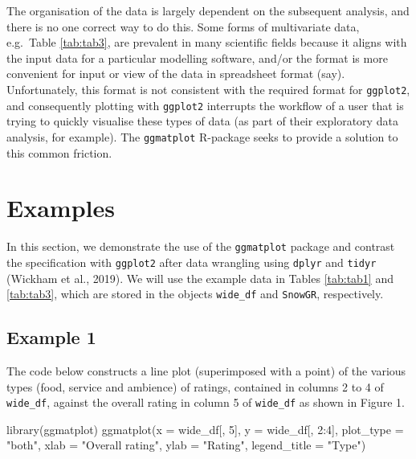 \documentclass[10pt,a4paper,onecolumn]{article}
\newenvironment{Shaded}{\begin{snugshade}}{\end{snugshade}}
\newcommand{\AttributeTok}[1]{\textcolor[rgb]{0.77,0.63,0.00}{#1}}
\newcommand{\DecValTok}[1]{\textcolor[rgb]{0.00,0.00,0.81}{#1}}
\newcommand{\FunctionTok}[1]{\textcolor[rgb]{0.00,0.00,0.00}{#1}}
\newcommand{\NormalTok}[1]{#1}
\newcommand{\SpecialCharTok}[1]{\textcolor[rgb]{0.00,0.00,0.00}{#1}}
\newcommand{\StringTok}[1]{\textcolor[rgb]{0.31,0.60,0.02}{#1}}
\begin{document}
The organisation of the data is largely dependent on the subsequent
analysis, and there is no one correct way to do this. Some forms of
multivariate data, e.g.~Table \ref{tab:tab3}, are prevalent in many
scientific fields because it aligns with the input data for a particular
modelling software, and/or the format is more convenient for input or
view of the data in spreadsheet format (say). Unfortunately, this format
is not consistent with the required format for \texttt{ggplot2}, and
consequently plotting with \texttt{ggplot2} interrupts the workflow of a
user that is trying to quickly visualise these types of data (as part of
their exploratory data analysis, for example). The \texttt{ggmatplot}
R-package seeks to provide a solution to this common friction.

\hypertarget{examples}{%
\section{Examples}\label{examples}}

In this section, we demonstrate the use of the \texttt{ggmatplot}
package and contrast the specification with \texttt{ggplot2} after data
wrangling using \texttt{dplyr} and \texttt{tidyr} (Wickham et al.,
2019). We will use the example data in Tables \ref{tab:tab1} and
\ref{tab:tab3}, which are stored in the objects \texttt{wide\_df} and
\texttt{SnowGR}, respectively.

\hypertarget{example-1}{%
\subsection{Example 1}\label{example-1}}

The code below constructs a line plot (superimposed with a point) of the
various types (food, service and ambience) of ratings, contained in
columns 2 to 4 of \texttt{wide\_df}, against the overall rating in
column 5 of \texttt{wide\_df} as shown in Figure 1.

\begin{Shaded}
\begin{Highlighting}[]
\FunctionTok{library}\NormalTok{(ggmatplot)}
\FunctionTok{ggmatplot}\NormalTok{(}\AttributeTok{x =}\NormalTok{ wide\_df[, }\DecValTok{5}\NormalTok{], }\AttributeTok{y =}\NormalTok{ wide\_df[, }\DecValTok{2}\SpecialCharTok{:}\DecValTok{4}\NormalTok{], }\AttributeTok{plot\_type =} \StringTok{"both"}\NormalTok{,}
          \AttributeTok{xlab =} \StringTok{"Overall rating"}\NormalTok{,  }\AttributeTok{ylab =} \StringTok{"Rating"}\NormalTok{, }\AttributeTok{legend\_title =} \StringTok{"Type"}\NormalTok{) }
\end{Highlighting}
\end{Shaded}
\end{document}
